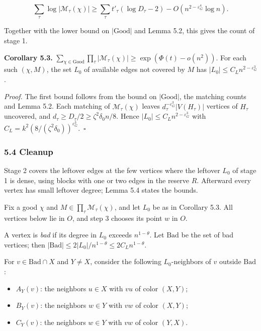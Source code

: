 \documentclass[english,11pt,a4paper]{article}
\providecommand{\tightlist}{\setlength{\itemsep}{0pt}\setlength{\parskip}{0pt}}
\begin{document}
\nopagebreak[4]
\[\sum_\tau\log|\mathcal M_\tau(\chi)|\ge\sum_\tau t'_\tau(\log D_\tau-2)-O(n^{2-\varepsilon_G^4}\log n).\]

Together with the lower bound on \(|\mathrm{Good}|\) and Lemma 5.2, this gives the count of stage 1.

\textbf{Corollary 5.3.} \(\sum_{\chi\in\mathrm{Good}}\prod_\tau|\mathcal M_\tau(\chi)|\ge\exp(\Phi(t)-o(n^2))\). For each such \((\chi,M)\), the set \(L_0\) of available edges not covered by \(M\) has \(|L_0|\le C_Ln^{2-\varepsilon_G^3}\).

\emph{Proof.} The first bound follows from the bound on \(|\mathrm{Good}|\), the matching counts and Lemma 5.2. Each matching of \(\mathcal M_\tau(\chi)\) leaves \(d_\tau^{-\varepsilon_G^3}|V(H_\tau)|\) vertices of \(H_\tau\) uncovered, and \(d_\tau\ge D_\tau/2\ge\zeta^2\delta_0n/8\). Hence \(|L_0|\le C_Ln^{2-\varepsilon_G^3}\) with \(C_L=k^2(8/(\zeta^2\delta_0))^{\varepsilon_G^3}\).~\(\square\)

\subsubsection{5.4 Cleanup}\label{cleanup}

Stage 2 covers the leftover edges at the few vertices where the leftover \(L_0\) of stage 1 is dense, using blocks with one or two edges in the reserve \(R\). Afterward every vertex has small leftover degree; Lemma 5.4 states the bounds.

Fix a good \(\chi\) and \(M\in\prod_\tau\mathcal M_\tau(\chi)\), and let \(L_0\) be as in Corollary 5.3. All vertices below lie in \(O\), and step 3 chooses its point \(w\) in \(O\).

A vertex is \emph{bad} if its degree in \(L_0\) exceeds \(n^{1-\theta}\). Let \(\mathrm{Bad}\) be the set of bad vertices; then \(|\mathrm{Bad}|\le2|L_0|/n^{1-\theta}\le2C_Ln^{1-\theta}\).

For \(v\in\mathrm{Bad}\cap X\) and \(Y\ne X\), consider the following \(L_0\)-neighbors of \(v\) outside \(\mathrm{Bad}\):

\begin{itemize}
\tightlist
\item
  \(A_Y(v)\): the neighbors \(u\in X\) with \(vu\) of color \((X,Y)\);
\item
  \(B_Y(v)\): the neighbors \(w\in Y\) with \(vw\) of color \((X,Y)\);
\item
  \(C_Y(v)\): the neighbors \(w\in Y\) with \(vw\) of color \((Y,X)\).
\end{itemize}
\end{document}
